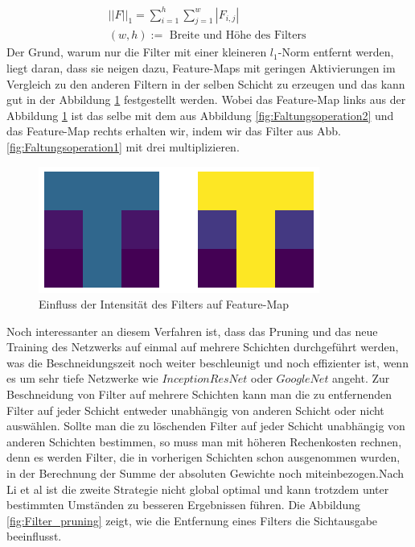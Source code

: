 \documentclass[12pt,a4paper]{scrartcl}
\numberwithin{equation}{section}
\begin{document}
\begin{itemize}
		\begin{equation}\label{eq:l_1}
			\begin{array}{c}		
			{||F||}_1 = \sum_{i =1}^{h}\sum_{j = 1}^{w}{|F_{i,j}|}\\
				(w, h) :=\text{ Breite und Höhe des Filters }
			\end{array}
		\end{equation}
		Der Grund, warum nur die Filter mit einer kleineren $ l_1 $-Norm entfernt werden, liegt daran, dass sie neigen dazu, Feature-Maps mit geringen Aktivierungen im Vergleich zu den anderen Filtern in der selben Schicht zu erzeugen und das kann gut in der Abbildung \ref{fig:Filter_Intensität} festgestellt werden. Wobei das Feature-Map links aus der Abbildung \ref{fig:Filter_Intensität} ist das selbe mit dem aus Abbildung \ref{fig:Faltungsoperation2} und das Feature-Map rechts erhalten wir, indem wir das Filter aus Abb. \ref{fig:Faltungsoperation1} mit drei multiplizieren.
	
		\begin{figure}[h!]
			\centering
				
			\includegraphics[scale=.75]{Filter_intensite}
			\caption{Einfluss der Intensität des Filters auf Feature-Map}
			\label{fig:Filter_Intensität}
		\end{figure}
		Noch interessanter an diesem Verfahren ist, dass das Pruning und das neue Training des Netzwerks auf einmal auf mehrere Schichten durchgeführt werden, was die Beschneidungszeit noch weiter beschleunigt  und noch effizienter ist, wenn es um sehr tiefe Netzwerke wie $ InceptionResNet $ oder $ GoogleNet $ angeht. Zur Beschneidung von Filter auf mehrere Schichten kann man die zu entfernenden Filter auf jeder Schicht entweder unabhängig von anderen Schicht oder nicht auswählen. Sollte man die zu löschenden Filter auf jeder Schicht unabhängig von anderen Schichten bestimmen, so muss man mit höheren Rechenkosten rechnen, denn es werden Filter, die in vorherigen Schichten schon ausgenommen wurden, in der Berechnung der Summe der absoluten Gewichte noch miteinbezogen.Nach Li et al \cite{Filter Pruning} ist die zweite Strategie nicht global optimal und kann trotzdem unter bestimmten Umständen zu besseren Ergebnissen führen. Die Abbildung \ref{fig:Filter_pruning} zeigt, wie die Entfernung eines Filters die Sichtausgabe beeinflusst.
		\begin{figure}[h!]
			\centering
			

\end{figure}
\end{itemize}
\end{document}
